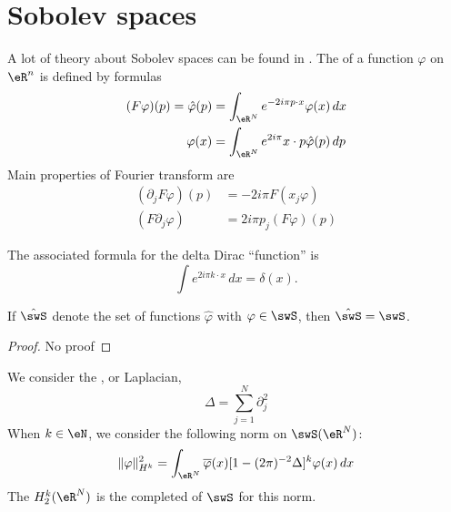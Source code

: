 
%
   \section{Sobolev spaces}\label{sec_Sobolev}
%

A lot of theory about Sobolev spaces can be found in \cite{Maslov,Taylor_PDO}. The  of a function $\varphi$ on $\eR^n$ is defined by formulas
\begin{subequations}
\begin{align}
  (F\varphi)(p)=\hat\varphi(p)&=\int_{\eR^N} e^{-2i\pi p\cdot x}\varphi(x)\,dx\\
	\varphi(x)&=\int_{\eR^{N}} e^{2i\pi}x\cdot p\hat\varphi(p)\,dp
\end{align}
\end{subequations}
Main properties of Fourier transform are
\begin{subequations} \label{subeq_prop_Four}
\begin{align}
(\partial_jF\varphi)(p)&=-2i\pi F(x_j\varphi)\\
	(F\partial_j\varphi)&=2i\pi p_j(F\varphi)(p)
\end{align}
\end{subequations}

The associated formula for the delta Dirac ``function'' is 
\begin{equation}
  \int e^{2i\pi k\cdot x}\,dx=\delta(x).
\end{equation}

\begin{proposition}
If $\hat\swS$ denote the set of functions $\hat\varphi$ with $\varphi\in\swS$, then $\hat\swS=\swS$. 
\end{proposition}

\begin{proof}
No proof
\end{proof}

We consider the , or Laplacian,
\begin{equation}
\Delta=\sum_{j=1}^{N}\partial_j^2
\end{equation}
When $k\in\eN$, we consider the following norm on $\swS(\eR^N)$:
\begin{equation} \label{eq_def_norm_Sob}
  \| \varphi \|_{H^k}^2=\int_{\eR^N}\overline{\varphi}(x)[1-(2\pi)^{-2}\Delta]^k\varphi(x)\,dx
\end{equation}
The  $H^k_2(\eR^N)$ is the completed of $\swS$ for this norm.

